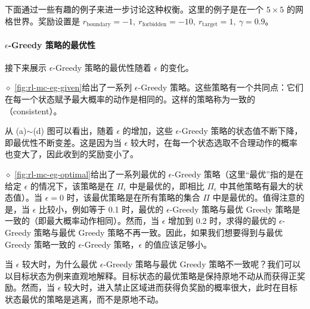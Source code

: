 下面通过一些有趣的例子来进一步讨论这种权衡。这里的例子是在一个 $5 \times 5$ 的网格世界。奖励设置是 $r_{\mathrm{boundary}} = -1,\ r_{\mathrm{forbidden}} = -10,\ r_{\mathrm{target}} = 1,\ \gamma = 0.9$。

\paragraph{$\epsilon$-Greedy 策略的最优性}
接下来展示 $\epsilon$-Greedy 策略的最优性随着 $\epsilon$ 的变化。

$\diamond$ \cref{fig:rl-mc-eg-given}给出了一系列 $\epsilon$-Greedy 策略。这些策略有一个共同点：它们在每一个状态赋予最大概率的动作是相同的。这样的策略称为一致的（consistent）。

从 (a)$\sim$(d) 图可以看出，随着 $\epsilon$ 的增加，这些 $\epsilon$-Greedy 策略的状态值不断下降，即最优性不断变差。这是因为当 $\epsilon$ 较大时，在每一个状态选取不合理动作的概率也变大了，因此收到的奖励变小了。

$\diamond$ \cref{fig:rl-mc-eg-optimal}给出了一系列最优的 $\epsilon$-Greedy 策略（这里“最优”指的是在给定 $\epsilon$ 的情况下，该策略是在 $\varPi_{\epsilon}$ 中是最优的，即相比 $\varPi_{\epsilon}$ 中其他策略有最大的状态值）。当 $\epsilon = 0$ 时，该最优策略是在所有策略的集合 $\varPi$ 中是最优的。值得注意的是，当 $\epsilon$ 比较小，例如等于 0.1 时，最优的 $\epsilon$-Greedy 策略与最优 Greedy 策略是一致的（即最大概率动作相同）。然而，当 $\epsilon$ 增加到 0.2 时，求得的最优的 $\epsilon$-Greedy 策略与最优 Greedy 策略不再一致。因此，如果我们想要得到与最优 Greedy 策略一致的 $\epsilon$-Greedy 策略，$\epsilon$ 的值应该足够小。

当 $\epsilon$ 较大时，为什么最优 $\epsilon$-Greedy 策略与最优 Greedy 策略不一致呢？我们可以以目标状态为例来直观地解释。目标状态的最优策略是保持原地不动从而获得正奖励。然而，当 $\epsilon$ 较大时，进入禁止区域进而获得负奖励的概率很大，此时在目标状态最优的策略是逃离，而不是原地不动。

